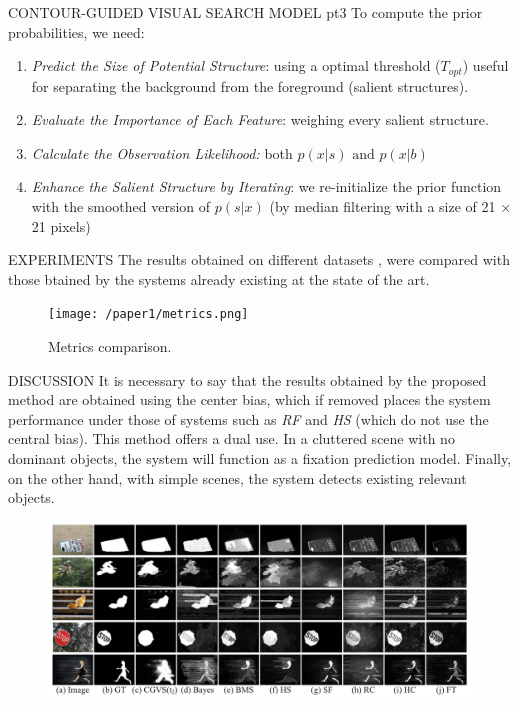 \documentclass[10pt]{beamer}
\begin{document}
\begin{frame}{CONTOUR-GUIDED VISUAL SEARCH MODEL pt3}
    To compute the prior probabilities, we need:
    \begin{enumerate}
        \item \emph{Predict the Size of Potential Structure}: using a optimal threshold ($ T_{opt} $) 
        useful for separating the background from the foreground (salient structures).
        \item \emph{Evaluate the Importance of Each Feature}: weighing every salient structure.
        \item \emph{Calculate the Observation Likelihood:} both $ p(x|s) \mbox{ and } p(x|b) $
        \item \emph{Enhance the Salient Structure by Iterating}: we re-initialize the prior 
        function with the smoothed version of $ p(s|x) $ (by median filtering 
        with a size of 21 × 21 pixels)
    \end{enumerate}
\end{frame}

\begin{frame}[t]{EXPERIMENTS}
    The results obtained on different datasets , were compared with those 
    btained by the systems already existing at the state of the art.
    \begin{figure}[htbp]
        \centering
        \texttt{[image: /paper1/metrics.png]}
        \centering
        \caption{Metrics comparison.}
        \label{fig: metrics}
    \end{figure}
\end{frame}

\begin{frame}{DISCUSSION}
    It is necessary to say that the results obtained by the proposed method 
    are obtained using the center bias, which if removed places the system 
    performance under those of systems such as \emph{RF}  and \emph{HS} (which do not 
    use the central bias). This method offers a dual use. In 
    a cluttered scene with no dominant objects, the system will function as a 
    fixation prediction model. Finally, on the other hand, with simple scenes, 
    the system detects existing relevant objects.
    \begin{figure}[htbp]
        \centering
        \includegraphics[width = 0.7 \linewidth]{paper1/SystemsComp.png}
        \centering
        \label{fig: metrics}
    \end{figure}
\end{frame}
\end{document}
